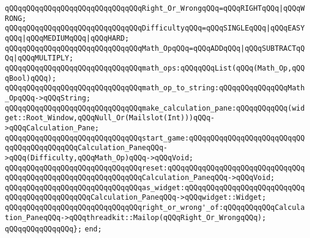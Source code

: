 \newline
\verb|qQQqqQQqqQQqqQQqqQQqqQQqqQQqqQQqRight_Or_WrongqQQq=qQQqRIGHTqQQq|\verb#|qQQqWRONG;#\newline
\newline
\verb|qQQqqQQqqQQqqQQqqQQqqQQqqQQqqQQqDifficultyqQQq=qQQqSINGLEqQQq|\verb#|qQQqEASYqQQq|qQQqMEDIUMqQQq|qQQqHARD;#\newline
\newline
\verb|qQQqqQQqqQQqqQQqqQQqqQQqqQQqqQQqMath_OpqQQq=qQQqADDqQQq|\verb#|qQQqSUBTRACTqQQq|qQQqMULTIPLY;#\newline
\newline
\verb|qQQqqQQqqQQqqQQqqQQqqQQqqQQqqQQqmath_ops:qQQqqQQqList(qQQq(Math_Op,qQQqBool)qQQq);|\newline
\verb|qQQqqQQqqQQqqQQqqQQqqQQqqQQqqQQqmath_op_to_string:qQQqqQQqqQQqqQQqMath_OpqQQq->qQQqString;|\newline
\newline
\verb|qQQqqQQqqQQqqQQqqQQqqQQqqQQqqQQqmake_calculation_pane:qQQqqQQqqQQq(widget::Root_Window,qQQqNull_Or(Mailslot(Int)))qQQq->qQQqCalculation_Pane;|\newline
\newline
\verb|qQQqqQQqqQQqqQQqqQQqqQQqqQQqqQQqstart_game:qQQqqQQqqQQqqQQqqQQqqQQqqQQqqQQqqQQqqQQqqQQqCalculation_PaneqQQq->qQQq(Difficulty,qQQqMath_Op)qQQq->qQQqVoid;|\newline
\verb|qQQqqQQqqQQqqQQqqQQqqQQqqQQqqQQqreset:qQQqqQQqqQQqqQQqqQQqqQQqqQQqqQQqqQQqqQQqqQQqqQQqqQQqqQQqqQQqqQQqCalculation_PaneqQQq->qQQqVoid;|\newline
\verb|qQQqqQQqqQQqqQQqqQQqqQQqqQQqqQQqas_widget:qQQqqQQqqQQqqQQqqQQqqQQqqQQqqQQqqQQqqQQqqQQqqQQqCalculation_PaneqQQq->qQQqwidget::Widget;|\newline
\verb|qQQqqQQqqQQqqQQqqQQqqQQqqQQqqQQqright_or_wrong'_of:qQQqqQQqqQQqCalculation_PaneqQQq->qQQqthreadkit::Mailop(qQQqRight_Or_WrongqQQq);|\newline
\verb|qQQqqQQqqQQqqQQq};|\newline
\verb|end;|\newline
\newline
\newline

